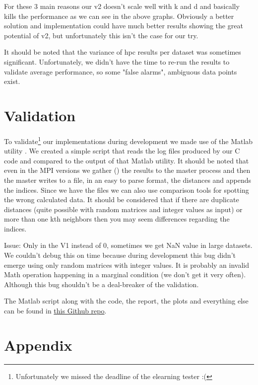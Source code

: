 \documentclass[12pt, a4paper]{article}
\begin{document}
For these 3 main reasons our v2 doesn't scale well with k and d and basically kills the performance as we can see in the above graphs. Obviously a better solution and implementation could have much better results showing the great potential of v2, but unfortunately this isn't the case for our try.



\vspace{0.5cm}
It should be noted that the variance of hpc results per dataset was sometimes significant. Unfortunately, we didn't have the time to re-run the results to validate  average performance, so some "false alarms", ambiguous data points exist.

\section{Validation}

To validate\footnote{Unfortunately we missed the deadline of the elearning tester :(} our implementations during development we made use of the Matlab utility . We created a simple script that reads the log files produced by our C code and compared to the output of that Matlab utility. It should be noted that even in the MPI versions we gather () the results to the master process and then the master writes to a file, in an easy to parse format, the distances and appends the indices. Since we have the files we can also use comparison tools for spotting the wrong calculated data. It should be considered that if there are duplicate distances (quite possible with random matrices and integer values as input) or more than one kth neighbors then you may seem differences regarding the indices. 

Issue: Only in the V1 instead of 0, sometimes we get NaN value in large datasets. We couldn't debug this on time because during development this bug didn't emerge using only random matrices with integer values. It is probably an invalid Math operation happening in a marginal condition (we don't get it very often). Although this bug shouldn't be a deal-breaker of the validation. 

\vspace{0.5cm}
The Matlab script along with the code, the report, the plots and everything else can be found in \href{https://github.com/thodkatz/ece-kNN.git}{this Github repo}.

\section{Appendix}
\end{document}
